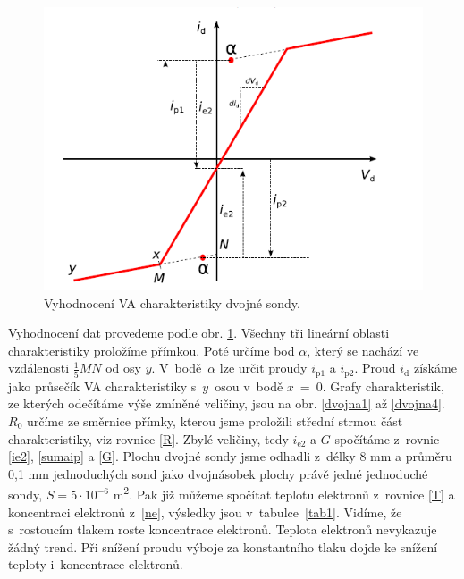 \documentclass[a4paper,12pt]{article}
\begin{document}
\begin{figure}[h]
	\centering
	\includegraphics[width=130mm]{VAmerenidvojna.png}
	\caption{Vyhodnocení VA charakteristiky dvojné sondy.}
	\label{VAmerenidvojna}
\end{figure}
Vyhodnocení dat provedeme podle obr. \ref{VAmerenidvojna}.
Všechny tři lineární oblasti charakteristiky proložíme přímkou.
Poté určíme bod $\alpha$, který se nachází ve vzdálenosti
$\frac{1}{5}MN$ od osy $y$. V~bodě~$\alpha$ lze určit proudy
$i_\text{{p1}}$ a $i_\text{{p2}}$. Proud $i_\text{{d}}$
získáme jako průsečík VA charakteristiky s~$y$~osou v~bodě
$x$~=~0. Grafy charakteristik, ze kterých odečítáme výše
zmíněné veličiny, jsou na obr. \ref{dvojna1} až \ref{dvojna4}.
$R_0$ určíme ze směrnice přímky, kterou jsme proložili
střední strmou část charakteristiky, viz rovnice \eqref{R}.
Zbylé veličiny, tedy $i_\text{{e2}}$ a $G$ spočítáme z~rovnic
\eqref{ie2}, \eqref{sumaip} a \eqref{G}. Plochu dvojné sondy
jsme odhadli
z~délky 8 \si{\milli\meter} a průměru 0,1 \si{\milli\meter}
jednoduchých sond jako dvojnásobek plochy právě
jedné jednoduché sondy, $S = 5\cdot10^{-6}$ \si{\meter\squared}.
Pak již můžeme
spočítat teplotu elektronů z~rovnice \eqref{T} a koncentraci
elektronů z~\eqref{ne}, výsledky jsou v~tabulce~\ref{tab1}.
Vidíme, že s~rostoucím tlakem roste koncentrace elektronů.
Teplota elektronů nevykazuje žádný trend. Při snížení proudu
výboje za konstantního tlaku dojde ke snížení teploty i~koncentrace
elektronů.
\end{document}

